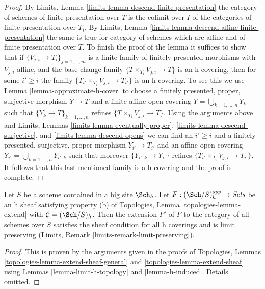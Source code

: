 \begin{proof}
By Limits, Lemma \ref{limits-lemma-descend-finite-presentation}
the category of schemes of finite presentation over $T$ is the
colimit over $I$ of the categories of finite presentation over $T_i$. By
Limits, Lemma \ref{limits-lemma-descend-affine-finite-presentation}
the same is true for category of schemes which are affine and
of finite presentation over $T$.
To finish the proof of the lemma it suffices to show that if
$\{V_{j, i} \to T_i\}_{j = 1, \ldots, m}$ is a finite family of
finitely presented morphisms with $V_{j, i}$ affine, and the
base change family $\{T \times_{T_i} V_{j, i} \to T\}$ is
an h covering, then for some $i' \geq i$ the family
$\{T_{i'} \times_{T_i} V_{j, i} \to T_{i'}\}$ is an h covering.
To see this we use Lemma \ref{lemma-approximate-h-cover} to
choose a finitely presented, proper, surjective
morphism $Y \to T$ and a finite affine open covering
$Y = \bigcup_{k = 1, \ldots, n} Y_k$ such that
$\{Y_k \to T\}_{k = 1, \ldots, n}$ refines
$\{T \times_{T_i} V_{j, i} \to T\}$.
Using the arguments above and
Limits, Lemmas \ref{limits-lemma-eventually-proper},
\ref{limits-lemma-descend-surjective}, and
\ref{limits-lemma-descend-opens}
we can find an $i' \geq i$ and a finitely presented, surjective, proper
morphism $Y_{i'} \to T_{i'}$ and an affine open covering
$Y_{i'} = \bigcup_{k = 1, \ldots, n} Y_{i', k}$
such that moreover $\{Y_{i', k} \to Y_{i'}\}$ refines
$\{T_{i'} \times_{T_i} V_{j, i} \to T_{i'}\}$.
It follows that this last mentioned family is
a h covering and the proof is complete.
\end{proof}

\begin{lemma}
\label{lemma-extend-sheaf-h}
Let $S$ be a scheme contained in a big site $\Sch_h$.
Let $F : (\Sch/S)_h^{opp} \to \textit{Sets}$ be an h sheaf satisfying
property (b) of Topologies, Lemma \ref{topologies-lemma-extend}
with $\mathcal{C} = (\Sch/S)_h$.
Then the extension $F'$ of $F$ to the category of all
schemes over $S$ satisfies the sheaf condition for all h coverings
and is limit preserving (Limits, Remark \ref{limits-remark-limit-preserving}).
\end{lemma}

\begin{proof}
This is proven by the arguments given in the proofs of
Topologies, Lemmas \ref{topologies-lemma-extend-sheaf-general} and
\ref{topologies-lemma-extend-sheaf} using
Lemmas \ref{lemma-limit-h-topology} and \ref{lemma-h-induced}.
Details omitted.
\end{proof}








